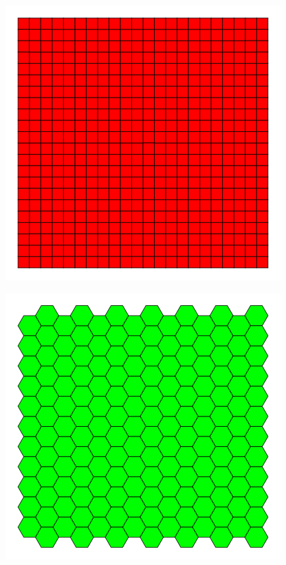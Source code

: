 \begin{figure}[htbp]
\centering
\includegraphics{image_0.png}
\caption{}
\end{figure}

\begin{figure}[htbp]
\centering
\includegraphics{image_1.png}
\caption{}
\end{figure}

